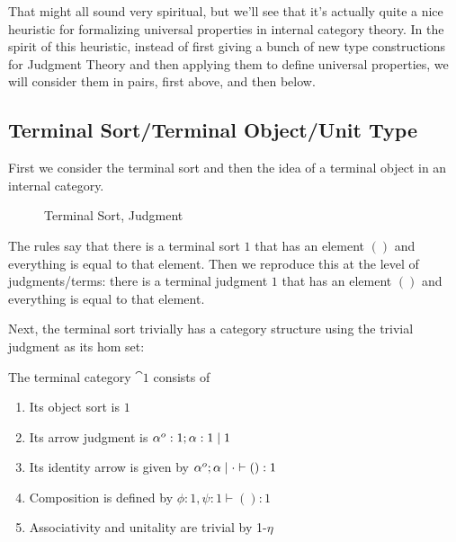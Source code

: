 \documentclass{article}
\begin{document}
That might all sound very spiritual, but we'll see that it's actually
quite a nice heuristic for formalizing universal properties in
internal category theory.
%
In the spirit of this heuristic, instead of first giving a bunch of
new type constructions for Judgment Theory and then applying them to
define universal properties, we will consider them in pairs, first
above, and then below.

\subsection{Terminal Sort/Terminal Object/Unit Type}

First we consider the terminal sort and then the idea of a terminal
object in an internal category.

\begin{figure}
  \caption{Terminal Sort, Judgment}
\end{figure}

The rules say that there is a terminal sort $1$ that has an element
$()$ and everything is equal to that element.
Then we reproduce this at the level of judgments/terms: there is a
terminal judgment $1$ that has an element $()$ and everything is equal
to that element.

Next, the terminal sort trivially has a category structure using the
trivial judgment as its hom set:

\begin{definition}
  The terminal category $\cat 1$ consists of
  \begin{enumerate}
  \item Its object sort is $1$
  \item Its arrow judgment is $\alpha^o:1;\alpha:1 \mathrel{|} 1$
  \item Its identity arrow is given by $\alpha^o;\alpha \mathrel{|} \cdot \vdash () : 1$
  \item Composition is defined by $\phi : 1, \psi : 1 \vdash () : 1$
  \item Associativity and unitality are trivial by \textsc{1-$\eta$}
  \end{enumerate}
\end{definition}
\end{document}
